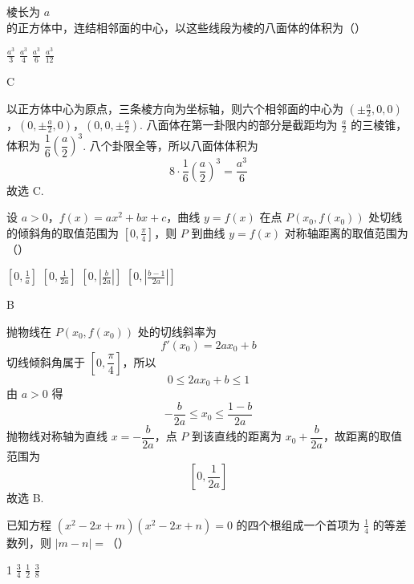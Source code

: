 \begin{problem}
棱长为 \(a\) 的正方体中，连结相邻面的中心，以这些线段为棱的八面体的体积为（\quad）

\choices
    {\(\frac{a^3}{3}\)}
    {\(\frac{a^3}{4}\)}
    {\(\frac{a^3}{6}\)}
    {\(\frac{a^3}{12}\)}
\end{problem}

\begin{answer}
C
\end{answer}

\begin{solution}
以正方体中心为原点，三条棱方向为坐标轴，则六个相邻面的中心为
\(\left(\pm\frac a2,0,0\right)\)，\(\left(0,\pm\frac a2,0\right)\)，\(\left(0,0,\pm\frac a2\right)\).
八面体在第一卦限内的部分是截距均为 \(\frac{a}{2}\) 的三棱锥，体积为 \(\dfrac16\left(\dfrac a2\right)^3\). 八个卦限全等，所以八面体体积为
\[
8\cdot\frac16\left(\frac a2\right)^3=\frac{a^3}{6}
\]
故选 C.
\end{solution}

\begin{problem}
设 \(a > 0\)，\(f(x) = ax^2 + bx + c\)，曲线 \(y = f(x)\) 在点 \(P(x_0, f(x_0))\) 处切线的倾斜角的取值范围为 \(\left[0, \frac{\pi}{4}\right]\)，则 \(P\) 到曲线 \(y = f(x)\) 对称轴距离的取值范围为（\quad）

\choices
    {\(\left[0, \frac{1}{a}\right]\)}
    {\(\left[0, \frac{1}{2a}\right]\)}
    {\(\left[0, \left|\frac{b}{2a}\right|\right]\)}
    {\(\left[0, \left|\frac{b-1}{2a}\right|\right]\)}
\end{problem}

\begin{answer}
B
\end{answer}

\begin{solution}
抛物线在 \(P(x_0,f(x_0))\) 处的切线斜率为
\[
f'(x_0)=2ax_0+b
\]
切线倾斜角属于 \(\left[0,\dfrac\pi4\right]\)，所以
\[
0\leqslant2ax_0+b\leqslant1
\]
由 \(a>0\) 得
\[
-\frac b{2a}\leqslant x_0\leqslant\frac{1-b}{2a}
\]
抛物线对称轴为直线 \(x=-\dfrac b{2a}\)，点 \(P\) 到该直线的距离为 \(x_0+\dfrac b{2a}\)，故距离的取值范围为
\[
\left[0,\frac1{2a}\right]
\]
故选 B.
\end{solution}

\begin{problem}
已知方程 \((x^{2} - 2x + m)(x^{2} - 2x + n) = 0\) 的四个根组成一个首项为 \(\frac{1}{4}\) 的等差数列，则 \(|m - n| =\)（\quad）

\choices
    {1}
    {\(\frac{3}{4}\)}
    {\(\frac{1}{2}\)}
    {\(\frac{3}{8}\)}
\end{problem}

